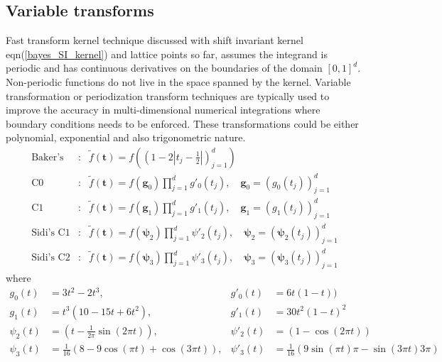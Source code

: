 \documentclass[smallextended]{svjour3}       %
\newcommand{\bm}[1]{\boldsymbol{#1}}
\newcommand{\vg}{\bm{g}}
\newcommand{\vt}{\bm{t}}
\def\abs#1{\ensuremath{\left \lvert #1 \right \rvert}}
\begin{document}
\subsection{Variable transforms}
Fast transform kernel technique discussed with shift invariant kernel eqn(\ref{bayes_SI_kernel}) and lattice points so far, assumes the integrand is periodic and has continuous derivatives on the boundaries of the domain $[0,1]^d$. Non-periodic functions do not live in the space spanned by the kernel.
Variable transformation or periodization transform techniques are typically used to improve the accuracy in multi-dimensional numerical integrations where boundary conditions needs to be enforced. These transformations could be either polynomial, exponential and also trigonometric nature.
\begin{eqnarray}
\text{Baker's} & : & \tilde{f}(\vt) 
= f\left( \left(1-2 \abs{t_j-\frac{1}{2}} \right)_{j=1}^d \right) 
\\
\text{C0} & : & \tilde{f}(\vt) 
= f\left( \vg_0 \right)\prod_{j=1}^d g'_0(t_j), 
  \quad \vg_0 = \left( g_0(t_j) \right)_{j=1}^d
\\
\text{C1} & : & \tilde{f}(\vt) 
= f\left( \vg_1\right)\prod_{j=1}^d g'_1(t_j),
  \quad \vg_1 = \left( g_1(t_j) \right)_{j=1}^d 
\\
\text{Sidi's C1} & : & \tilde{f}(\vt) 
= f\left( \bm{\psi}_2 \right) \prod_{j=1}^d \psi'_2(t_j),
  \quad \bm{\psi}_2 = \left( \bm{\psi}_2(t_j) \right)_{j=1}^d
\\
\text{Sidi's C2} & : & \tilde{f}(\vt) 
= f\left( \bm{\psi}_3 \right) \prod_{j=1}^d \psi'_3(t_j),
  \quad \bm{\psi}_3 = \left( \bm{\psi}_3(t_j) \right)_{j=1}^d
\end{eqnarray}
where
\begin{align*}
g_0(t) &= 3 t^2 - 2 t^3,  & g'_0(t) &= 6t(1-t))
\\
g_1(t) &= t^3(10-15t+6t^2),  & g'_1(t) &= 30t^2(1-t)^2
\\
\psi_2(t)   &= 
\left(t - \frac{1}{2\pi} \sin(2\pi t) \right) 
, &
\psi'_2(t) &= 
\left(1 - \cos(2 \pi t)  \right) 
\\
\psi_3(t)   &= 
\frac{1}{16} \left(8-9\cos(\pi t)+ \cos(3\pi t) \right) 
, & 
\psi'_3(t) &= 
\frac{1}{16} \left(9 \sin(\pi t) \pi - \sin(3 \pi t) 3 \pi \right) 
\end{align*}
\end{document}
